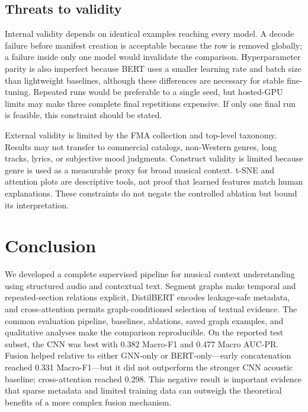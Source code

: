 \IfFileExists{IEEEtran.cls}{\usingieeetrue\documentclass[conference]{IEEEtran}}{\usingieeefalse\documentclass[10pt,twocolumn]{article}}
\begin{document}
\subsection{Threats to validity}
Internal validity depends on identical examples reaching every model. A decode failure before manifest creation is acceptable because the row is removed globally; a failure inside only one model would invalidate the comparison. Hyperparameter parity is also imperfect because BERT uses a smaller learning rate and batch size than lightweight baselines, although these differences are necessary for stable fine-tuning. Repeated runs would be preferable to a single seed, but hosted-GPU limits may make three complete final repetitions expensive. If only one final run is feasible, this constraint should be stated.

External validity is limited by the FMA collection and top-level taxonomy. Results may not transfer to commercial catalogs, non-Western genres, long tracks, lyrics, or subjective mood judgments. Construct validity is limited because genre is used as a measurable proxy for broad musical context. t-SNE and attention plots are descriptive tools, not proof that learned features match human explanations. These constraints do not negate the controlled ablation but bound its interpretation.

\section{Conclusion}
We developed a complete supervised pipeline for musical context understanding using structured audio and contextual text. Segment graphs make temporal and repeated-section relations explicit, DistilBERT encodes leakage-safe metadata, and cross-attention permits graph-conditioned selection of textual evidence. The common evaluation pipeline, baselines, ablations, saved graph examples, and qualitative analyses make the comparison reproducible. On the reported test subset, the CNN was best with 0.382 Macro-F1 and 0.477 Macro AUC-PR. Fusion helped relative to either GNN-only or BERT-only---early concatenation reached 0.331 Macro-F1---but it did not outperform the stronger CNN acoustic baseline; cross-attention reached 0.298. This negative result is important evidence that sparse metadata and limited training data can outweigh the theoretical benefits of a more complex fusion mechanism.


\end{document}
